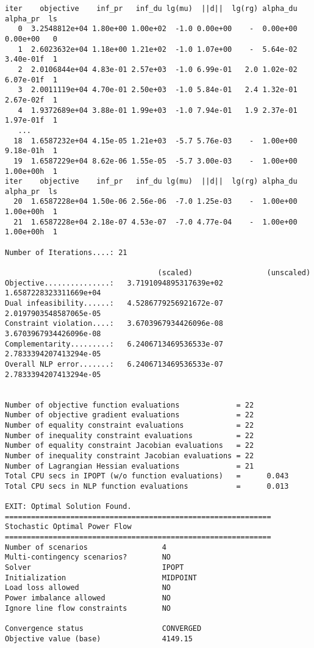 \begin{lstlisting}
iter    objective    inf_pr   inf_du lg(mu)  ||d||  lg(rg) alpha_du alpha_pr  ls
   0  3.2548812e+04 1.80e+00 1.00e+02  -1.0 0.00e+00    -  0.00e+00 0.00e+00   0
   1  2.6023632e+04 1.18e+00 1.21e+02  -1.0 1.07e+00    -  5.64e-02 3.40e-01f  1
   2  2.0106844e+04 4.83e-01 2.57e+03  -1.0 6.99e-01   2.0 1.02e-02 6.07e-01f  1
   3  2.0011119e+04 4.70e-01 2.50e+03  -1.0 5.84e-01   2.4 1.32e-01 2.67e-02f  1
   4  1.9372689e+04 3.88e-01 1.99e+03  -1.0 7.94e-01   1.9 2.37e-01 1.97e-01f  1
   ...
  18  1.6587232e+04 4.15e-05 1.21e+03  -5.7 5.76e-03    -  1.00e+00 9.18e-01h  1
  19  1.6587229e+04 8.62e-06 1.55e-05  -5.7 3.00e-03    -  1.00e+00 1.00e+00h  1
iter    objective    inf_pr   inf_du lg(mu)  ||d||  lg(rg) alpha_du alpha_pr  ls
  20  1.6587228e+04 1.50e-06 2.56e-06  -7.0 1.25e-03    -  1.00e+00 1.00e+00h  1
  21  1.6587228e+04 2.18e-07 4.53e-07  -7.0 4.77e-04    -  1.00e+00 1.00e+00h  1

Number of Iterations....: 21

                                   (scaled)                 (unscaled)
Objective...............:   3.7191094895317639e+02    1.6587228323311669e+04
Dual infeasibility......:   4.5286779256921672e-07    2.0197903548587065e-05
Constraint violation....:   3.6703967934426096e-08    3.6703967934426096e-08
Complementarity.........:   6.2406713469536533e-07    2.7833394207413294e-05
Overall NLP error.......:   6.2406713469536533e-07    2.7833394207413294e-05


Number of objective function evaluations             = 22
Number of objective gradient evaluations             = 22
Number of equality constraint evaluations            = 22
Number of inequality constraint evaluations          = 22
Number of equality constraint Jacobian evaluations   = 22
Number of inequality constraint Jacobian evaluations = 22
Number of Lagrangian Hessian evaluations             = 21
Total CPU secs in IPOPT (w/o function evaluations)   =      0.043
Total CPU secs in NLP function evaluations           =      0.013

EXIT: Optimal Solution Found.
=============================================================
Stochastic Optimal Power Flow
=============================================================
Number of scenarios                 4
Multi-contingency scenarios?        NO
Solver                              IPOPT
Initialization                      MIDPOINT
Load loss allowed                   NO
Power imbalance allowed             NO
Ignore line flow constraints        NO

Convergence status                  CONVERGED
Objective value (base)              4149.15


\end{lstlisting}
